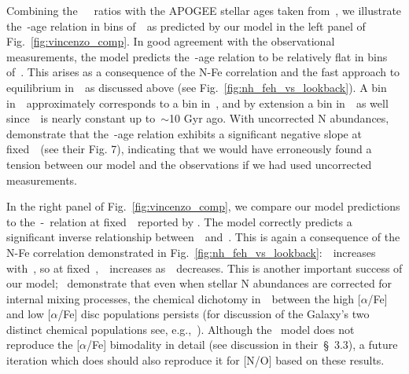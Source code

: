 \documentclass[ms.tex]{subfiles}
\begin{document}
Combining the~\citet{Vincenzo2021}~\no~ratios with the APOGEE stellar ages
taken from~\citet{Miglio2021}, we illustrate the~\no-age relation in bins
of~\feh~as predicted by our model in the left panel of
Fig.~\ref{fig:vincenzo_comp}.
In good agreement with the observational measurements, the model predicts
the~\no-age relation to be relatively flat in bins of~\feh.
This arises as a consequence of the N-Fe correlation and the fast approach to
equilibrium in~\oh~as discussed above (see Fig.~\ref{fig:nh_feh_vs_lookback}).
A bin in~\feh~approximately corresponds to a bin in~\nh, and by extension a bin
in~\no~as well since~\oh~is nearly constant up to~$\sim$10 Gyr ago.
With uncorrected N abundances,~\citet{Vincenzo2021} demonstrate that the~\no-age
relation exhibits a significant negative slope at fixed~\feh~(see their Fig. 7),
indicating that we would have erroneously found a tension between our model and
the observations if we had used uncorrected measurements.
\par
In the right panel of Fig.~\ref{fig:vincenzo_comp}, we compare our model
predictions to the~\no-\ofe~relation at fixed~\oh~reported by
\citet{Vincenzo2021}.
The model correctly predicts a significant inverse relationship
between~\no~and~\ofe.
This is again a consequence of the N-Fe correlation demonstrated in
Fig.~\ref{fig:nh_feh_vs_lookback}:~\nh~increases with~\feh, so at
fixed~\oh,~\no~increases as~\ofe~decreases.
This is another important success of our model;~\citet{Vincenzo2021}
demonstrate that even when stellar N abundances are corrected for internal
mixing processes, the chemical dichotomy in~\no~between the high [$\alpha$/Fe]
and low [$\alpha$/Fe] disc populations persists (for discussion of the
Galaxy's two distinct chemical populations see, e.g.,~\citealp{Hayden2015,
Weinberg2019, Weinberg2021, Griffith2021b}).
Although the~\citet{Johnson2021} model does not reproduce the [$\alpha$/Fe]
bimodality in detail (see discussion in their~\S~3.3), a future iteration which
does should also reproduce it for [N/O] based on these results.
\end{document}
